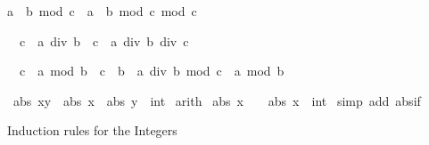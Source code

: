 \begin{isabellebody}
\begin{isamarkuptext}
\begin{isabelle}%
a\ {}\ b\ mod\ c\ {}\ a\ {}\ {}b\ mod\ c{}\ mod\ c%
\end{isabelle}

\begin{isabelle}%
{}\ {}\ c\ {}\ a\ div\ {}b\ {}\ c{}\ {}\ a\ div\ b\ div\ c%
\end{isabelle}

\begin{isabelle}%
{}\ {}\ c\ {}\ a\ mod\ {}b\ {}\ c{}\ {}\ b\ {}\ {}a\ div\ b\ mod\ c{}\ {}\ a\ mod\ b%
\end{isabelle}
%
\end{isamarkuptext}%
\isamarkuptrue%
\isamarkupfalse%
\ {}abs\ {}x{}y{}\ {}\ abs\ x\ {}\ abs\ {}y\ {}{}\ int{}{}\isanewline
%
\isadelimproof
%
\endisadelimproof
%
\isatagproof
{}\isamarkupfalse%
\ arith%
\endisatagproof
{\isafoldproof}%
%
\isadelimproof
\isanewline
%
\endisadelimproof
\isanewline
{}\isamarkupfalse%
\ {}abs\ {}{}{}x{}\ {}\ {}\ {}\ abs\ {}x\ {}{}\ int{}{}\isanewline
%
\isadelimproof
%
\endisadelimproof
%
\isatagproof
{}\isamarkupfalse%
\ {}simp\ add{}\ abs{}if{}%
\endisatagproof
{\isafoldproof}%
%
\isadelimproof
%
\endisadelimproof
%
\begin{isamarkuptext}%
Induction rules for the Integers


\end{isamarkuptext}
\end{isabellebody}
